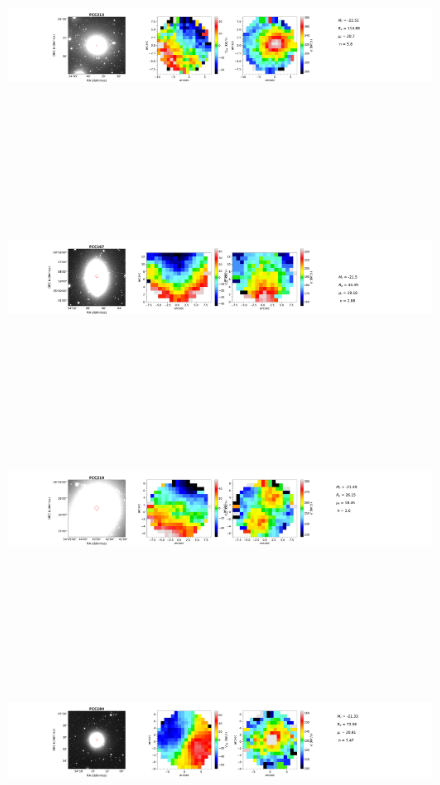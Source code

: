 \documentclass{aa}
\begin{document}
\clearpage
\begin{figure}[!htb]
   \centering
   \includegraphics[width=21cm,height=6cm,keepaspectratio]{../2_pipeline/1_V&S_Maps/213Velocity_map.pdf}
   \includegraphics[width=21cm,height=6cm,keepaspectratio]{../2_pipeline/1_V&S_Maps/167Velocity_map.pdf}
   \includegraphics[width=21cm,height=6cm,keepaspectratio]{../2_pipeline/1_V&S_Maps/219Velocity_map.pdf}
   \includegraphics[width=21cm,height=6cm,keepaspectratio]{../2_pipeline/1_V&S_Maps/184Velocity_map.pdf}

\end{figure}
\end{document}
